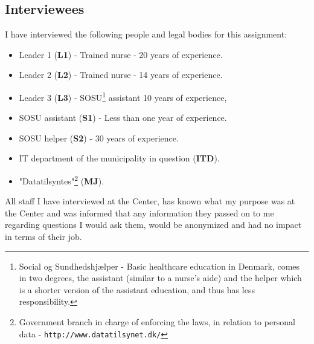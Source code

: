 \documentclass[11pt]{article}
\begin{document}
\subsection{Interviewees}
I have interviewed the following people and legal bodies for this assignment:
\begin{itemize}
\item Leader 1 (\textbf{L1}) - Trained nurse - 20 years of experience.
\item Leader 2 (\textbf{L2}) - Trained nurse - 14 years of experience.
\item Leader 3 (\textbf{L3}) - SOSU\footnote{Social og Sundhedshjælper - Basic healthcare education in Denmark, comes in two degrees, the assistant (similar to a nurse's aide) and the helper which is a shorter version of the assistant education, and thus has less responsibility.} assistant 10 years of experience,
\item SOSU assistant (\textbf{S1}) - Less than one year of experience.
\item SOSU helper (\textbf{S2}) - 30 years of experience.
\item IT department of the municipality in question (\textbf{ITD}).
\item "Datatilsyntes"\footnote{Government branch in charge of enforcing the laws, in relation to personal data - \texttt{http://www.datatilsynet.dk/}} (\textbf{MJ}).
\end{itemize}

All staff I have interviewed at the Center, has known what my purpose was at the Center and was informed that any information they passed on to me regarding questions I would ask them, would be anonymized and had no impact in terms of their job.
\pagebreak
\end{document}
